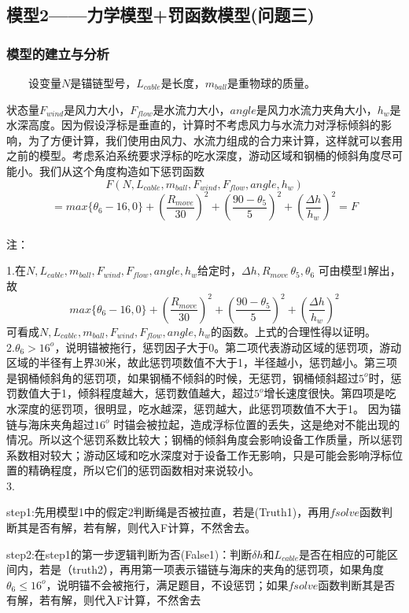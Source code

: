 \documentclass[a4paper,12pt]{ctexart}
\begin{document}
\subsection{模型2——力学模型+罚函数模型(问题三)}
\subsubsection{模型的建立与分析}

~~~~设变量$N$是锚链型号，$L_{cable}$是长度，$m_{ball}$是重物球的质量。

状态量$F_{wind}$是风力大小，$F_{flow}$是水流力大小，$angle$是风力水流力夹角大小，$h_{w}$是水深高度。因为假设浮标是垂直的，计算时不考虑风力与水流力对浮标倾斜的影响，为了方便计算，我们使用由风力、水流力组成的合力来计算，这样就可以套用之前的模型。考虑系泊系统要求浮标的吃水深度，游动区域和钢桶的倾斜角度尽可能小。我们从这个角度构造如下惩罚函数
\[F(N,L_{cable},m_{ball},F_{wind},F_{flow},angle,h_{w})\]
\[=max\{\theta_{6}-16,0\}+(\frac{R_{move}}{30})^2+(\frac{90-\theta_{5}}{5})^2+(\frac{\Delta h}{h_{w}})^2=F\]\\
注：

1.在\(N,L_{cable},m_{ball},F_{wind},F_{flow},angle,h_{w}\)给定时，\(\Delta h,R_{move}\,\theta_{5},\theta_{6}\) 可由模型1解出，故\[max\{\theta_{6}-16,0\}+(\frac{R_{move}}{30})^2+(\frac{90-\theta_{5}}{5})^2+(\frac{\Delta h}{h_{w}})^2\]
可看成\(N,L_{cable},m_{ball},F_{wind},F_{flow},angle,h_{w}\)的函数。上式的合理性得以证明。
\\

2.$\theta_{6}>16^o$，说明锚被拖行，惩罚因子大于0。第二项代表游动区域的惩罚项，游动区域的半径有上界30米，故此惩罚项数值不大于1，半径越小，惩罚越小。第三项是钢桶倾斜角的惩罚项，如果钢桶不倾斜的时候，无惩罚，钢桶倾斜超过$5^o$时，惩罚数值大于1，倾斜程度越大，惩罚数值越大，超过$5^o$增长速度很快。第四项是吃水深度的惩罚项，很明显，吃水越深，惩罚越大，此惩罚项数值不大于1。 因为锚链与海床夹角超过$16^o$ 时锚会被拉起，造成浮标位置的丢失，这是绝对不能出现的情况。所以这个惩罚系数比较大；钢桶的倾斜角度会影响设备工作质量，所以惩罚系数相对较大；游动区域和吃水深度对于设备工作无影响，只是可能会影响浮标位置的精确程度，所以它们的惩罚函数相对来说较小。\\

3.{\color{red}{函数内部逻辑}}

   step1:先用模型1中的假定2判断绳是否被拉直，若是(Truth1)，再用$fsolve$函数判断其是否有解，若有解，则代入F计算，不然舍去。

   step2:在step1的第一步逻辑判断为否(False1)：判断$\delta h$和$L_{cable}$是否在相应的可能区间内，若是（truth2），再用第一项表示锚链与海床的夹角的惩罚项，如果角度$\theta_{6}\leq 16^o$，说明锚不会被拖行，满足题目，不设惩罚；如果$fsolve$函数判断其是否有解，若有解，则代入F计算，不然舍去
\end{document}
